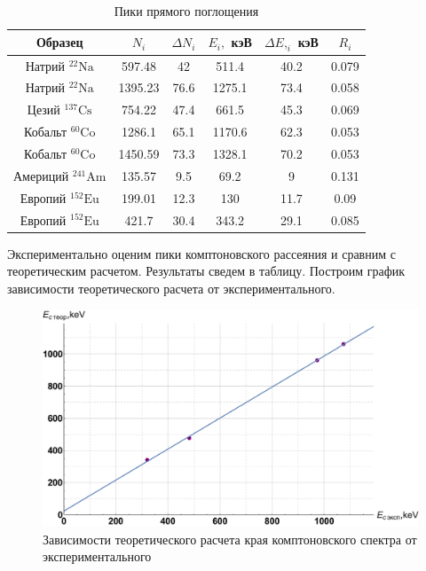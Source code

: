 \documentclass[12pt]{kiarticle}
\begin{document}
	
	\begin{table}[H]
		\caption{Пики прямого поглощения}
		\begin{center}
			\begin{tabular}{|c|c|c|c|c|c|}
				\hline 
				Образец & $N_i $ & $ \Delta N_i $ & $ E_i, $ кэВ & $ \Delta E,_i $ кэВ  & $ R_i $ \\ 
				\hline 
				Натрий $ \mathrm{^{22}Na} $ & 597.48 & 42 & 511.4 & 40.2 & 0.079 \\
				Натрий $ \mathrm{^{22}Na} $& 1395.23 & 76.6 & 1275.1 & 73.4 & 0.058 \\
				Цезий $ \mathrm{^{137}Cs} $ & 754.22 & 47.4 & 661.5 & 45.3 & 0.069 \\
				Кобальт $ \mathrm{^{60}Co} $ & 1286.1 & 65.1 & 1170.6 & 62.3 & 0.053 \\
				Кобальт $ \mathrm{^{60}Co} $ & 1450.59 & 73.3 & 1328.1 & 70.2 & 0.053 \\
				Америций $ \mathrm{^{241}Am} $& 135.57 & 9.5 & 69.2 & 9 & 0.131 \\
				Европий	 $ \mathrm{^{152}Eu} $& 199.01 & 12.3 & 130 & 11.7 & 0.09 \\
				Европий	 $ \mathrm{^{152}Eu} $& 421.7 & 30.4 & 343.2 & 29.1 & 0.085 \\
				\hline 
			\end{tabular} 
		\end{center}
		\label{res}
	\end{table}

	Экспериментально оценим пики комптоновского рассеяния и сравним с теоретическим расчетом. Результаты сведем в таблицу. Построим график зависимости теоретического расчета от экспериментального. 
	
	\begin{figure}[H]
		\label{graf_com}
		\includegraphics[scale=0.5]{comp.pdf}
		\caption{Зависимости теоретического расчета края комптоновского спектра от экспериментального}
	\end{figure} 
	
\end{document}

